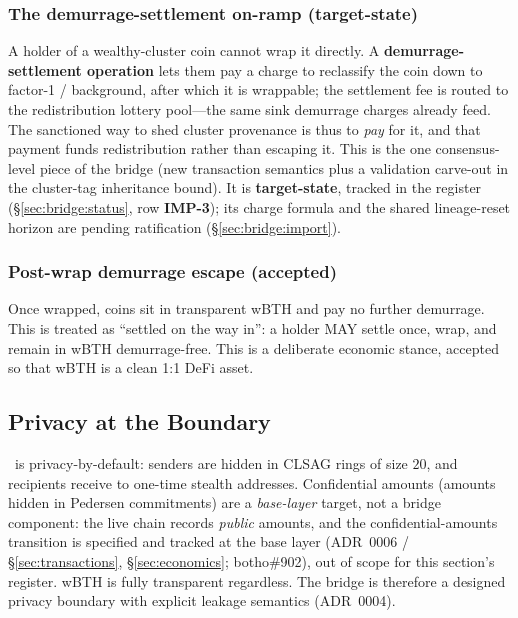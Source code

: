 \subsubsection{The demurrage-settlement on-ramp (target-state)}

A holder of a wealthy-cluster coin cannot wrap it directly. A
\textbf{demurrage-settlement operation} lets them pay a charge to reclassify the
coin down to factor-1 / background, after which it is wrappable; the settlement
fee is routed to the redistribution lottery pool---the same sink demurrage
charges already feed. The sanctioned way to shed cluster provenance is thus to
\emph{pay} for it, and that payment funds redistribution rather than escaping
it. This is the one consensus-level piece of the bridge (new transaction
semantics plus a validation carve-out in the cluster-tag inheritance bound). It
is \textbf{target-state}, tracked in the register (\S\ref{sec:bridge:status},
row \textbf{IMP-3});
its charge formula and the shared lineage-reset horizon are pending
ratification (\S\ref{sec:bridge:import}).

\subsubsection{Post-wrap demurrage escape (accepted)}

Once wrapped, coins sit in transparent wBTH and pay no further demurrage. This
is treated as ``settled on the way in'': a holder MAY settle once, wrap, and
remain in wBTH demurrage-free. This is a deliberate economic stance, accepted so
that wBTH is a clean 1:1 DeFi asset.

\subsection{Privacy at the Boundary}
\label{sec:bridge:privacy}

\Botho\ is privacy-by-default: senders are hidden in CLSAG rings of size
$20$,
and recipients receive to one-time stealth addresses. Confidential amounts
(amounts hidden in Pedersen commitments) are a \emph{base-layer} target, not a
bridge component: the live chain records \emph{public} amounts, and the
confidential-amounts transition is specified and tracked at the base layer
(ADR~0006 / \S\ref{sec:transactions}, \S\ref{sec:economics}; botho\#902), out of
scope for this section's register. wBTH is fully transparent regardless. The
bridge is therefore a designed privacy boundary with explicit leakage semantics
(ADR~0004).

